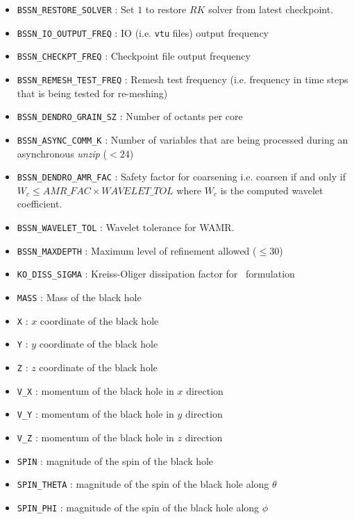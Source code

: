 \begin{itemize}
\item \texttt{BSSN\_RESTORE\_SOLVER} : Set $1$ to restore $RK$ solver from latest checkpoint. 
\item \texttt{BSSN\_IO\_OUTPUT\_FREQ} : IO (i.e. \texttt{vtu} files) output frequency
\item \texttt{BSSN\_CHECKPT\_FREQ} : Checkpoint file output frequency
\item \texttt{BSSN\_REMESH\_TEST\_FREQ} : Remesh test frequency (i.e. frequency in time steps that is being tested for re-meshing) 
\item \texttt{BSSN\_DENDRO\_GRAIN\_SZ} : Number of octants per core 
\item \texttt{BSSN\_ASYNC\_COMM\_K} : Number of variables that are being processed during an asynchronous \textit{unzip} ($<24$)
\item \texttt{BSSN\_DENDRO\_AMR\_FAC} : Safety factor for coarsening i.e. coarsen if and only if $W_c \leq AMR\_FAC \times WAVELET\_TOL$ where $W_c$ is the computed wavelet coefficient.  
\item \texttt{BSSN\_WAVELET\_TOL} : Wavelet tolerance for WAMR. 
\item \texttt{BSSN\_MAXDEPTH} : Maximum level of refinement allowed ($\leq 30$)
\item \texttt{KO\_DISS\_SIGMA} : Kreiss-Oliger dissipation factor for \BSSN~formulation
\item \texttt{MASS} : Mass of the black hole
\item \texttt{X} : $x$ coordinate of the black hole
\item \texttt{Y} : $y$ coordinate of the black hole
\item \texttt{Z} : $z$ coordinate of the black hole
\item \texttt{V\_X} : momentum of the black hole in $x$ direction
\item \texttt{V\_Y} : momentum of the black hole in $y$ direction
\item \texttt{V\_Z} : momentum of the black hole in $z$ direction
\item \texttt{SPIN} : magnitude of the spin of the black hole
\item \texttt{SPIN\_THETA} : magnitude of the spin of the black hole along $\theta$
\item \texttt{SPIN\_PHI} : magnitude of the spin of the black hole along $\phi$
\end{itemize}

